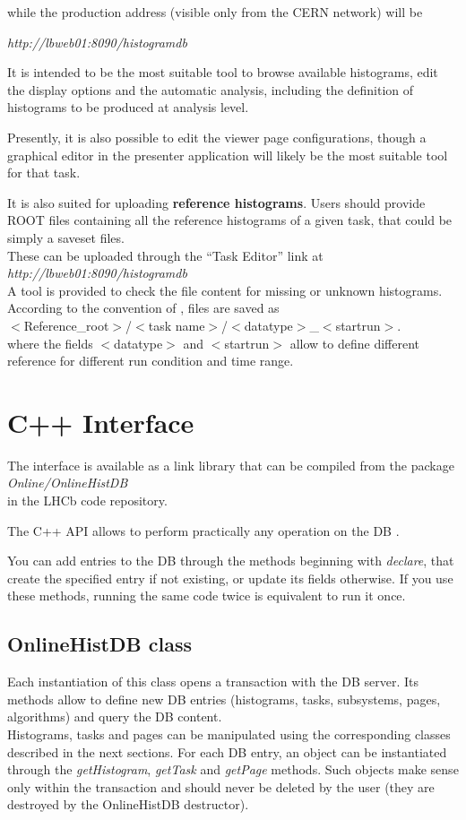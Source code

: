 \documentclass{lhcbnote}
\begin{document}
while the production address (visible only from the CERN network)
will be \\
\centerline{ \it http://lbweb01:8090/histogramdb}  

It is intended to be the most suitable tool to browse available
histograms, edit the display options and the automatic analysis, including
the definition of histograms to be produced at analysis level.

Presently, it is also possible to edit the viewer page configurations, though
a graphical editor in the presenter application will likely be the
most suitable tool for that task.

It is also suited for uploading {\bf reference histograms}. Users should
provide ROOT files containing all the reference histograms of a given
task, that could be simply a saveset files. \\
These can be uploaded through the ``Task Editor'' link at \\
{ \it http://lbweb01:8090/histogramdb} \\
A tool is provided to check the file content for missing or unknown histograms.
According to the convention of \cite{dbdesign}, files are saved as \\
$<$Reference\_root$>$/$<$task name$>$/$<$datatype$>$\_$<$startrun$>$.\\
where the fields $<$datatype$>$ and $<$startrun$>$ allow to define
different reference for different run condition and time range. 

\section{C++ Interface}

The interface is available as a link library that can be compiled from
the package \\
{\it Online/OnlineHistDB} \\
in the LHCb code repository.

The C++ API allows to perform practically any operation on the DB .

You can add entries to the DB through the methods beginning with {\it
declare}, that create the specified entry if not existing, or 
update its fields otherwise. If you use these methods, running the
same code twice is equivalent to run it once.


\subsection{OnlineHistDB class}
Each instantiation of this class opens a transaction with the DB
server. Its methods allow to define new DB entries (histograms,
tasks, subsystems, pages, algorithms) and query the DB content. \\
Histograms, tasks and pages can be manipulated using the corresponding
classes described in the next sections. For each DB entry, an object can be
instantiated through the {\it getHistogram},  {\it getTask} and {\it
getPage} methods. Such objects make sense only within the transaction
and should never be deleted by the user (they are destroyed by the
OnlineHistDB destructor). 
\end{document}
